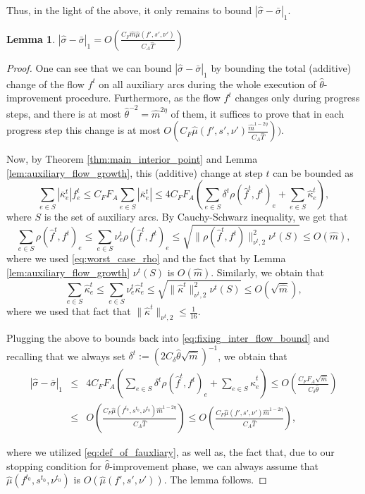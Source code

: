 \documentclass[11pt, letterpaper]{article}
\newtheorem{lemma}[theorem]{Lemma}
\newcommand{\cdelta}{C_{\delta}}
\newcommand{\cfreeze}{C_{F}}
\newcommand{\cauxiliary}{C_{A}}
\newcommand{\fauxiliary}{F_{A}}
\newcommand{\norm}[2]{\|#1\|_{#2}}
\newcommand{\onorm}[1]{|#1|_{1}}
\newcommand{\hm}{\widehat{m}}
\newcommand{\hT}{\widehat{T}}
\newcommand{\hmu}{\hat{\mu}}
\newcommand{\htheta}{\hat{\theta}}
\newcommand{\okappa}{\bar{\kappa}}
\newcommand{\hkappa}{\hat{\kappa}}
\newcommand{\vrho}{\boldsymbol{\mathit{\rho}}}
\newcommand{\vnu}{\boldsymbol{\mathit{\nu}}}
\newcommand{\ovsigma}{\boldsymbol{\mathit{\bar{\sigma}}}}
\newcommand{\hvsigma}{\boldsymbol{\mathit{\hat{\sigma}}}}
\newcommand{\ff}{\boldsymbol{\mathit{f}}}
\newcommand{\hff}{\boldsymbol{\mathit{\hat{f}}}}
\renewcommand{\ss}{\boldsymbol{\mathit{s}}}
\begin{document}
Thus, in the light of the above, it only remains to bound $\onorm{\hvsigma-\ovsigma}$. 

\begin{lemma}
\label{lem:fixing_value_flow}
$\onorm{\hvsigma-\ovsigma}=O(\frac{\cfreeze\hm \hmu(\ff',\ss',\vnu')}{\cauxiliary \hT})$
\end{lemma}

\begin{proof}
One can see that we can bound $\onorm{\hvsigma-\ovsigma}$ by bounding the total (additive) change of the flow $\ff^t$ on all auxiliary arcs during the whole execution of $\htheta$-improvement procedure. Furthermore, as the flow $\ff^t$ changes only during progress steps, and there is at most $\htheta^{-2}=\hm^{2\eta}$ of them, it suffices to prove that in each progress step this change is at most $O(\cfreeze\hmu(\ff',\ss',\vnu')\frac{\hm^{1-2\eta} }{\cauxiliary \hT}))$. 

Now, by Theorem \ref{thm:main_interior_point} and Lemma \ref{lem:auxiliary_flow_growth}, this (additive) change at step $t$ can be bounded as
\begin{equation}\label{eq:fixing_inter_flow_bound}
\sum_{e\in S} |\okappa_e^t| f_e^t \leq \cfreeze \fauxiliary \sum_{e\in S} |\okappa_e^t| \leq 4 \cfreeze \fauxiliary \left(\sum_{e\in S} \delta^t \rho(\hff^t,\ff^t)_e + \sum_{e\in S} \hkappa_e^t\right),
\end{equation}
where $S$ is the set of auxiliary arcs. By Cauchy-Schwarz inequality, we get that 
\[
\sum_{e\in S}  \rho(\hff^t,\ff^t)_e \leq \sum_{e\in S} \nu_e^t \rho(\hff^t,\ff^t)_e \leq \sqrt{\norm{\vrho(\hff^t,\ff^t)}{\vnu^t,2}^2 \vnu^t(S)}\leq O(\hm),
\] 
where we used \eqref{eq:worst_case_rho} and the fact that by Lemma \ref{lem:auxiliary_flow_growth} $\vnu^t(S)$ is $O(\hm)$. Similarly, we obtain that
\[
\sum_{e\in S} \hkappa_e^t \leq \sum_{e\in S} \nu_e^t \hkappa_e^t \leq \sqrt{\norm{\hkappa^t}{\vnu^t,2}^2 \vnu^t(S)}\leq O(\sqrt{\hm}),
\]
where we used that fact that $\norm{\hkappa^t}{\vnu^t,2}\leq \frac{1}{16}$. 

Plugging the above to bounds back into \eqref{eq:fixing_inter_flow_bound} and recalling that we always set $\delta^t:=(2\cdelta\htheta \sqrt{\hm})^{-1}$, we obtain that
\begin{eqnarray*}
\onorm{\hvsigma-\ovsigma}&\leq& 4 \cfreeze \fauxiliary \left(\sum_{e\in S} \delta^t \rho(\hff^t,\ff^t)_e + \sum_{e\in S} \hkappa_e^t\right)\leq  O\left(\frac{\cfreeze \fauxiliary\sqrt{\hm}}{\cdelta \htheta}\right)\\
&\leq & O\left(\frac{\cfreeze \hmu(\ff^{t_0},\ss^{t_0},\vnu^{t_0})\hm^{1-2\eta} }{\cauxiliary \hT}\right) \leq O\left(\frac{\cfreeze \hmu(\ff',\ss',\vnu')\hm^{1-2\eta} }{\cauxiliary \hT}\right),
\end{eqnarray*}

where we utilized \eqref{eq:def_of_fauxliary}, as well as, the fact that, due to our stopping condition for $\htheta$-improvement phase, we can always assume that $\hmu(\ff^{t_0},\ss^{t_0},\vnu^{t_0})$ is $O(\hmu(\ff',\ss',\vnu'))$. The lemma follows.
\end{proof}
\end{document}
